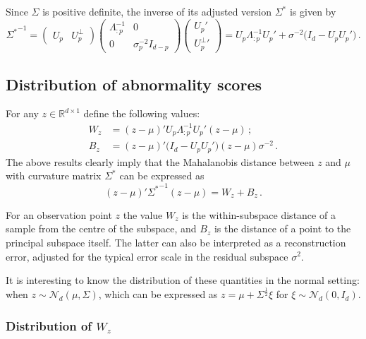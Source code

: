 \documentclass[a4paper,14pt]{article}
\newcommand{\Real}{\mathbb{R}}
\begin{document}
Since $\Sigma$ is positive definite, the inverse of its adjusted version $\Sigma^*$
is given by
$$ {\Sigma^*}^{-1}
    = \begin{pmatrix}U_p & U_p^\perp\end{pmatrix}
    \begin{pmatrix}\Lambda_{:p}^{-1} & 0\\0&\sigma^{-2}_p I_{d-p}\end{pmatrix}
    \begin{pmatrix}U_p'\\{U_p^\perp}'\end{pmatrix}
    = U_p\Lambda_{:p}^{-1}U_p' + \sigma^{-2} \bigl(I_d - U_p U_p' \bigr)
    \,.$$


\subsection{Distribution of abnormality scores} %
\label{sub:distribution_of_abnormality_scores}

For any $z\in \Real^{d\times 1}$ define the following values:
\begin{align*}
    W_z &= (z-\mu)' U_p\Lambda_{:p}^{-1} U_p' (z-\mu)\,;\\
    B_z &= (z-\mu)' \bigl( I_d - U_p U_p'\bigr) (z-\mu) \sigma^{-2}\,.
\end{align*}
The above results clearly imply that the Mahalanobis distance between $z$ and $\mu$
with curvature matrix $\Sigma^*$ can be expressed as
$$ (z-\mu)'{\Sigma^*}^{-1}(z-\mu) = W_z + B_z \,.$$

For an observation point $z$ the value $W_z$ is the within-subspace distance of
a sample from the centre of the subspace, and $B_z$ is the distance of a point to
the principal subspace itself. The latter can also be interpreted as a reconstruction
error, adjusted for the typical error scale in the residual subspace $\sigma^2$.

It is interesting to know the distribution of these quantities in the normal setting:
when $z\sim\mathcal{N}_d(\mu, \Sigma)$, which can be expressed as $z = \mu + \Sigma^\frac{1}{2} \xi$
for $\xi\sim\mathcal{N}_d(0, I_d)$.


\subsubsection{Distribution of $W_z$} %
\label{ssub:distribution_of_w_z}
\end{document}
